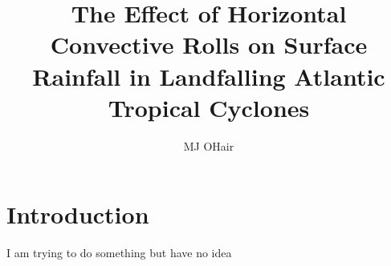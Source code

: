 \documentclass[12pt]{article}
\author{MJ OHair} \title{The Effect of Horizontal Convective Rolls on Surface Rainfall in Landfalling Atlantic Tropical Cyclones}
\begin{document}
\maketitle


\section{Introduction}

I am trying to do something but have no idea
\end{document}
